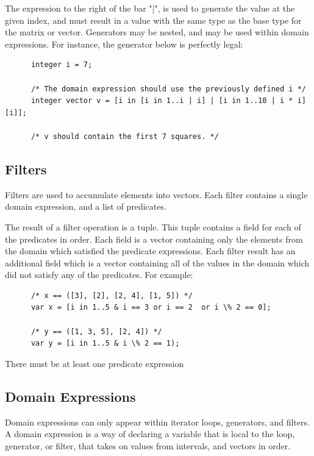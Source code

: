 \documentclass{article}
\begin{document}
    The expression to the right of the bar "|", is used to generate the value at the given index, and must result in
    a value with the same type as the base type for the matrix or vector. Generators may be nested, and may be used
    within domain expressions. For instance, the generator below is perfectly legal:

    \begin{lstlisting}
      integer i = 7;

      /* The domain expression should use the previously defined i */
      integer vector v = [i in [i in 1..i | i] | [i in 1..10 | i * i][i]];

      /* v should contain the first 7 squares. */
    \end{lstlisting}


  \subsection{Filters}\label{sec:filters}

    Filters are used to accumulate elements into vectors. Each filter contains a single domain expression, and a
    list of predicates.

    The result of a filter operation is a tuple. This tuple contains a field for each of the predicates in order.
    Each field is a vector containing only the elements from the domain which satisfied the predicate expressions.
    Each filter result has an additional field which is a vector containing all of the values in the domain which
    did not satisfy any of the predicates. For example:

    \begin{lstlisting}
      /* x == ([3], [2], [2, 4], [1, 5]) */
      var x = [i in 1..5 & i == 3 or i == 2  or i \% 2 == 0];

      /* y == ([1, 3, 5], [2, 4]) */
      var y = [i in 1..5 & i \% 2 == 1);
    \end{lstlisting}

    There must be at least one predicate expression

  \subsection{Domain Expressions}
    Domain expressions can only appear within iterator loops, generators, and filters. A domain expression is a way
    of declaring a variable that is local to the loop, generator, or filter, that takes on values from intervals,
    and vectors in order.
\end{document}
